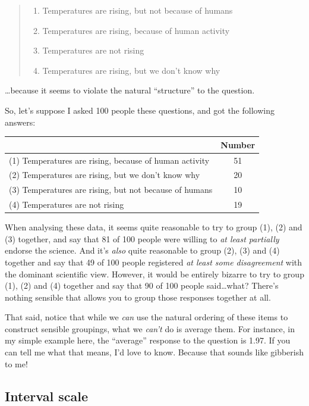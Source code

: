 \documentclass[]{book}
\providecommand{\tightlist}{%
  \setlength{\itemsep}{0pt}\setlength{\parskip}{0pt}}
\begin{document}
\begin{quote}
\begin{enumerate}
\def\labelenumi{(\arabic{enumi})}
\setcounter{enumi}{2}
\tightlist
\item
  Temperatures are rising, but not because of humans\\
\item
  Temperatures are rising, because of human activity\\
\item
  Temperatures are not rising\\
\item
  Temperatures are rising, but we don't know why
\end{enumerate}
\end{quote}

\ldots{}because it seems to violate the natural ``structure'' to the question.

So, let's suppose I asked 100 people these questions, and got the following answers:

\begin{longtable}[]{@{}lc@{}}
\toprule
& Number\tabularnewline
\midrule
\endhead
(1) Temperatures are rising, because of human activity & 51\tabularnewline
(2) Temperatures are rising, but we don't know why & 20\tabularnewline
(3) Temperatures are rising, but not because of humans & 10\tabularnewline
(4) Temperatures are not rising & 19\tabularnewline
\bottomrule
\end{longtable}

When analysing these data, it seems quite reasonable to try to group (1), (2) and (3) together, and say that 81 of 100 people were willing to {\emph{at least partially}} endorse the science. And it's {\emph{also}} quite reasonable to group (2), (3) and (4) together and say that 49 of 100 people registered {\emph{at least some disagreement}} with the dominant scientific view. However, it would be entirely bizarre to try to group (1), (2) and (4) together and say that 90 of 100 people said\ldots{}what? There's nothing sensible that allows you to group those responses together at all.

That said, notice that while we {\emph{can}} use the natural ordering of these items to construct sensible groupings, what we {\emph{can't}} do is average them. For instance, in my simple example here, the ``average'' response to the question is 1.97. If you can tell me what that means, I'd love to know. Because that sounds like gibberish to me!

\hypertarget{interval-scale}{%
\subsection{Interval scale}\label{interval-scale}}
\end{document}
